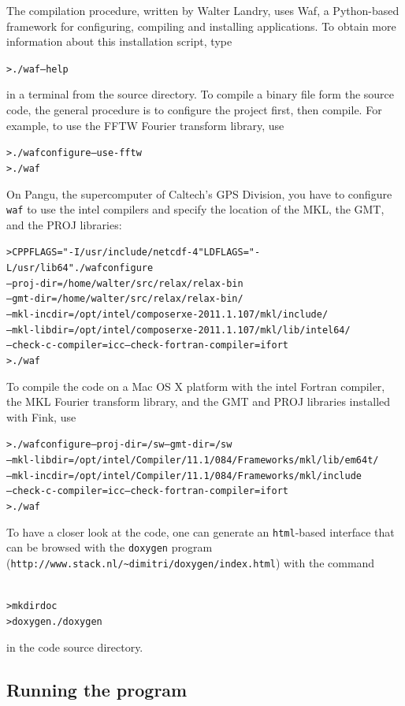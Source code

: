 \documentclass[10pt]{article}
\begin{document}
The compilation procedure, written by Walter Landry, uses Waf, a Python-based framework for configuring, compiling and installing applications. To obtain more information about this installation script, type
\begin{alltt}
{\color{orange}> ./waf --help}
\end{alltt}
in a terminal from the source directory. To compile a binary file form the source code, the general procedure is to configure the project first, then compile. For example, to use the FFTW Fourier transform library, use
\begin{alltt}
{\color{orange}> ./waf configure --use-fftw
> ./waf}
\end{alltt}
On Pangu, the supercomputer of Caltech's GPS Division, you have to configure \verb'waf' to use the intel compilers and specify the location of the MKL, the GMT, and the PROJ libraries:
\begin{alltt}
{\color{orange}> CPPFLAGS="-I/usr/include/netcdf-4" LDFLAGS="-L/usr/lib64" ./waf configure 
--proj-dir=/home/walter/src/relax/relax-bin 
--gmt-dir=/home/walter/src/relax/relax-bin/ 
--mkl-incdir=/opt/intel/composerxe-2011.1.107/mkl/include/ 
--mkl-libdir=/opt/intel/composerxe-2011.1.107/mkl/lib/intel64/ 
--check-c-compiler=icc --check-fortran-compiler=ifort
> ./waf}
\end{alltt}
To compile the code on a Mac OS X platform with the intel Fortran compiler, the MKL Fourier transform library, and the GMT and PROJ libraries installed with Fink, use
\begin{alltt}
{\color{orange}> ./waf configure --proj-dir=/sw --gmt-dir=/sw 
--mkl-libdir=/opt/intel/Compiler/11.1/084/Frameworks/mkl/lib/em64t/ 
--mkl-incdir=/opt/intel/Compiler/11.1/084/Frameworks/mkl/include 
--check-c-compiler=icc --check-fortran-compiler=ifort
> ./waf}
\end{alltt}

To have a closer look at the code, one can generate an \verb'html'-based interface that can be browsed with the \verb'doxygen' program (\verb'http://www.stack.nl/~dimitri/doxygen/index.html') with the command
\begin{alltt}
{\color{orange}
> mkdir doc
> doxygen ./doxygen}
\end{alltt}
in the code source directory.



\subsection{Running the program}
\end{document}
